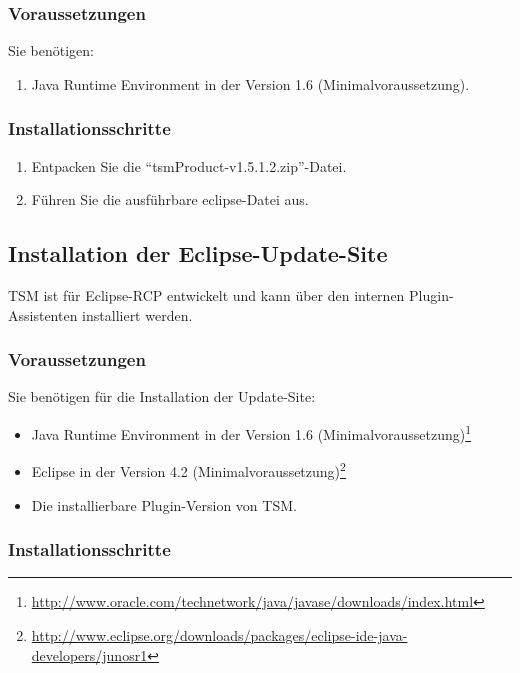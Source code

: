 \documentclass[11pt,a4paper,titlepage]{article}
\begin{document}
\subsubsection{Voraussetzungen}
Sie benötigen:
\begin{enumerate}
 \item Java Runtime Environment in der Version 1.6 (Minimalvoraussetzung).
\end{enumerate}

\subsubsection{Installationsschritte}
\begin{enumerate}
 \item Entpacken Sie die "`tsmProduct-v1.5.1.2.zip"'-Datei.
 \item Führen Sie die ausführbare eclipse-Datei aus.
\end{enumerate}


\subsection{Installation der Eclipse-Update-Site}
TSM ist für Eclipse-RCP entwickelt und kann über den internen Plugin-Assistenten installiert werden.


\subsubsection{Voraussetzungen}
Sie benötigen für die Installation der Update-Site:
\begin{itemize}
 \item Java Runtime Environment in der Version 1.6 (Minimalvoraussetzung)\footnote{\href{http://www.oracle.com/technetwork/java/javase/downloads/index.html}
 {http://www.oracle.com/technetwork/java/javase/downloads/index.html}}
 \item Eclipse in der Version 4.2 (Minimalvoraussetzung)\footnote{\href{http://www.eclipse.org/downloads/packages/eclipse-ide-java-developers/junosr1}
 {http://www.eclipse.org/downloads/packages/eclipse-ide-java-developers/junosr1}}
 \item Die installierbare Plugin-Version von TSM.
\end{itemize}

\subsubsection{Installationsschritte}
\end{document}
